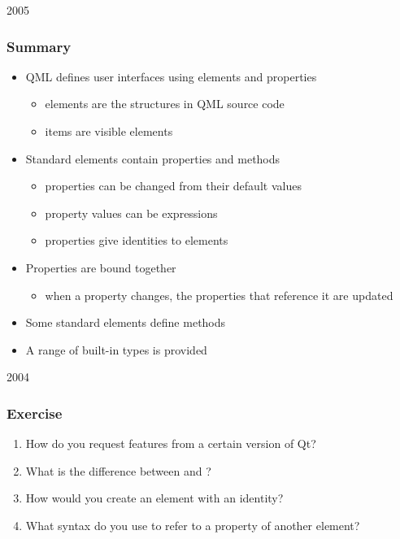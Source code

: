 \begin{slide}{2005}\frametitle{Summary}

\begin{itemize}
\item QML defines user interfaces using elements and properties
  \begin{itemize}
  \item elements are the structures in QML source code
  \item items are visible elements
  \end{itemize}
\item Standard elements contain properties and methods
  \begin{itemize}
  \item properties can be changed from their default values
  \item property values can be expressions
  \item {} properties give identities to elements
  \end{itemize}
\item Properties are bound together
  \begin{itemize}
  \item when a property changes, the properties that reference it are updated
  \end{itemize}
\item Some standard elements define methods
\item A range of built-in types is provided
\end{itemize}


\end{slide}

                                   

\begin{slide}{2004}\frametitle{Exercise}

\begin{enumerate}
\item How do you request features from a certain version of Qt?
\item What is the difference between  and ?
\item How would you create an element with an identity?
\item What syntax do you use to refer to a property of another element?
\end{enumerate}

\end{slide}

